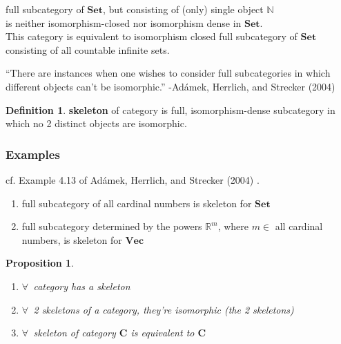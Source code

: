 \documentclass[twoside,landscape,10pt]{amsart}
\theoremstyle{plain}
\newtheorem{proposition}{Proposition}
\theoremstyle{definition}
\newtheorem{definition}{Definition}
\theoremstyle{remark}
\begin{document}
\begin{multicols*}{2}
full subcategory of $\mathbf{\text{Set}}$, but consisting of (only) single object $\mathbb{N}$ \\
\phantom{ \quad \, } is neither isomorphism-closed nor isomorphism dense in $\mathbf{\text{Set}}$.  \\
\phantom{ \quad \quad \, } This category is equivalent to isomorphism closed full subcategory of $\mathbf{\text{Set}}$ consisting of all countable infinite sets.  

``There are instances when one wishes to consider full subcategories in which different objects can't be isomorphic.'' -Ad\'{a}mek, Herrlich, and Strecker (2004) \cite{AHS2004}

\begin{definition}
  \textbf{skeleton} of category is full, isomorphism-dense subcategory in which no 2 distinct objects are isomorphic.  
\end{definition}

\subsubsection{Examples} cf. Example 4.13 of Ad\'{a}mek, Herrlich, and Strecker (2004) \cite{AHS2004}.
\begin{enumerate}
\item full subcategory of all cardinal numbers is skeleton for $\mathbf{\text{Set}}$ 
\item full subcategory determined by the powers $\mathbb{R}^m$, where $m\in $ all cardinal numbers, is skeleton for $\mathbf{\text{Vec}}$
\end{enumerate}

\begin{proposition}
  \begin{enumerate}
\item $\forall \, $ category has a skeleton
\item $\forall \, $ 2 skeletons of a category, they're isomorphic (the 2 skeletons)
\item $\forall \, $ skeleton of category $\mathbf{C}$ is equivalent to $\mathbf{C}$
\end{enumerate}
\end{proposition}


\end{multicols*}
\end{document}
